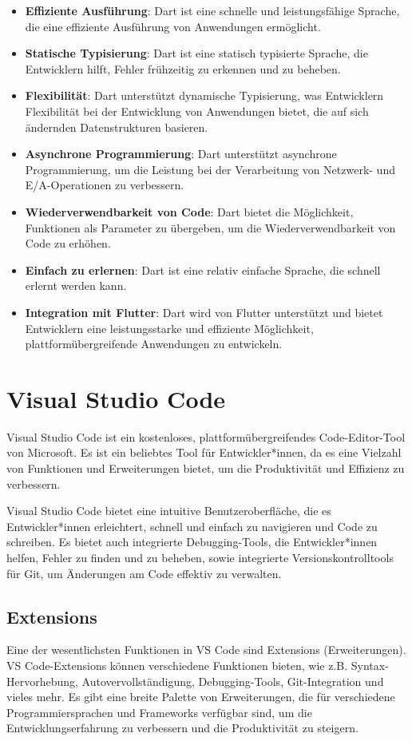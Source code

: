 \begin{itemize}
\item \textbf{Effiziente Ausführung}: Dart ist eine schnelle und leistungsfähige Sprache, die eine effiziente Ausführung von Anwendungen ermöglicht.
\item \textbf{Statische Typisierung}: Dart ist eine statisch typisierte Sprache, die Entwicklern hilft, Fehler frühzeitig zu erkennen und zu beheben.
\item \textbf{Flexibilität}: Dart unterstützt dynamische Typisierung, was Entwicklern Flexibilität bei der Entwicklung von Anwendungen bietet, die auf sich ändernden Datenstrukturen basieren.
\item \textbf{Asynchrone Programmierung}: Dart unterstützt asynchrone Programmierung, um die Leistung bei der Verarbeitung von Netzwerk- und E/A-Operationen zu verbessern.
\item \textbf{Wiederverwendbarkeit von Code}: Dart bietet die Möglichkeit, Funktionen als Parameter zu übergeben, um die Wiederverwendbarkeit von Code zu erhöhen.
\item \textbf{Einfach zu erlernen}: Dart ist eine relativ einfache Sprache, die schnell erlernt werden kann.
\item \textbf{Integration mit Flutter}: Dart wird von Flutter unterstützt und bietet Entwicklern eine leistungsstarke und effiziente Möglichkeit, plattformübergreifende Anwendungen zu entwickeln.
\end{itemize}

\pagebreak
\section{Visual Studio Code}
Visual Studio Code \cite{VSCodeDocs} ist ein kostenloses, plattformübergreifendes Code-Editor-Tool von Microsoft. Es ist ein beliebtes Tool für Entwickler*innen, 
da es eine Vielzahl von Funktionen und Erweiterungen bietet, um die Produktivität und Effizienz zu verbessern.

Visual Studio Code bietet eine intuitive Benutzeroberfläche, die es Entwickler*innen erleichtert, schnell und einfach zu navigieren und Code zu schreiben. 
Es bietet auch integrierte Debugging-Tools, die Entwickler*innen helfen, Fehler zu finden und zu beheben, sowie integrierte Versionskontrolltools für Git, 
um Änderungen am Code effektiv zu verwalten.

\subsection{Extensions}
Eine der wesentlichsten Funktionen in VS Code sind Extensions (Erweiterungen). VS Code-Extensions können verschiedene Funktionen bieten, 
wie z.B. Syntax-Hervorhebung, Autovervollständigung, Debugging-Tools, Git-Integration und vieles mehr. 
Es gibt eine breite Palette von Erweiterungen, die für verschiedene Programmiersprachen und Frameworks verfügbar sind, 
um die Entwicklungserfahrung zu verbessern und die Produktivität zu steigern.

